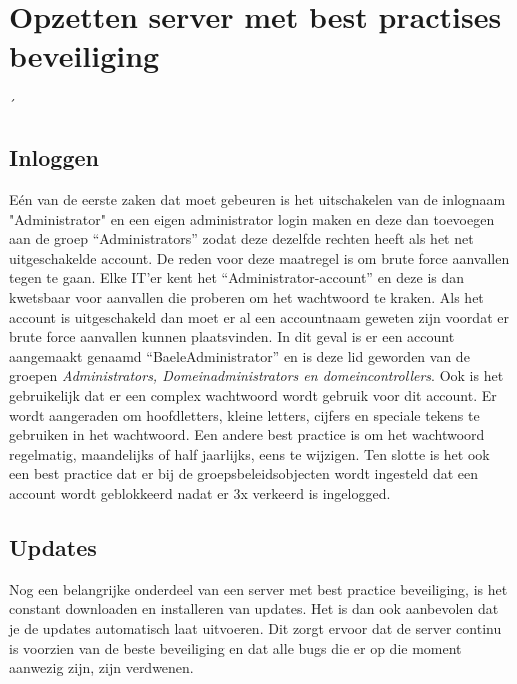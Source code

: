 \documentclass[pdftex,a4paper,12pt]{report}
\begin{document}
\chapter{Opzetten server met best practises beveiliging}
´%

\section{Inloggen}
Eén van de eerste zaken dat moet gebeuren is het uitschakelen van de inlognaam "Administrator" en een eigen administrator login maken en deze dan toevoegen aan de groep "`Administrators"' zodat deze dezelfde rechten heeft als het net uitgeschakelde account. De reden voor deze maatregel is om brute force aanvallen tegen te gaan. Elke IT'er kent het "`Administrator-account"' en deze is dan kwetsbaar voor aanvallen die proberen om het wachtwoord te kraken. Als het account is uitgeschakeld dan moet er al een accountnaam geweten zijn voordat er brute force aanvallen kunnen plaatsvinden. In dit geval is er een account aangemaakt genaamd "`BaeleAdministrator"' en is deze lid geworden van de groepen \textit{Administrators, Domeinadministrators en domeincontrollers}. Ook is het gebruikelijk dat er een complex wachtwoord wordt gebruik voor dit account. Er wordt aangeraden om hoofdletters, kleine letters, cijfers en speciale tekens te gebruiken in het wachtwoord. Een andere best practice is om het wachtwoord regelmatig, maandelijks of half jaarlijks, eens te wijzigen. Ten slotte is het ook een best practice dat er bij de groepsbeleidsobjecten wordt ingesteld dat een account wordt geblokkeerd nadat er 3x verkeerd is ingelogged. 

\section{Updates}
Nog een belangrijke onderdeel van een server met best practice beveiliging, is het constant downloaden en installeren van updates. Het is dan ook aanbevolen dat je de updates automatisch laat uitvoeren. Dit zorgt ervoor dat de server continu is voorzien van de beste beveiliging en dat alle bugs die er op die moment aanwezig zijn, zijn verdwenen. 
\end{document}
